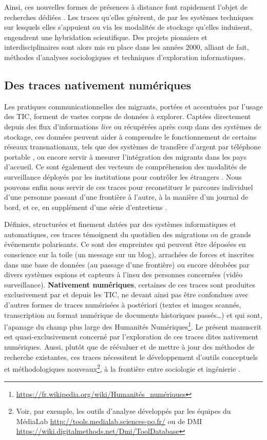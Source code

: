 \documentclass[symmetric,justified,marginals=raggedouter]{tufte-book}
\begin{document}
Ainsi, ces nouvelles formes de présences à distance font rapidement l'objet de recherches dédiées \citep{diminescu_les_2002}. Les traces qu'elles génèrent, de par les systèmes techniques sur lesquels elles s'appuient ou via les modalités de stockage qu'elles induisent, engendrent une hybridation scientifique. Des projets pionniers et interdisciplinaires sont alors mis en place dans les années 2000, alliant de fait, méthodes d'analyses sociologiques et techniques d'exploration informatiques. 

\subsection{Des traces nativement numériques}

\noindent Les pratiques communicationnelles des migrants, portées et accentuées par l'usage des TIC, forment de vastes corpus de données à explorer. Captées directement depuis des flux d'informations \textit{live} ou récupérées après coup dans des systèmes de stockage, ces données peuvent aider à comprendre le fonctionnement de certains réseaux transnationaux, tels que des systèmes de transfère d'argent par téléphone portable \citep{bounie_analyse_2010}, ou encore servir à mesurer l'inté\-gration des migrants dans les pays d'accueil. Ce sont également des vecteurs de compréhension des modalités de surveillance déployés par les institutions pour contrôler les étrangers \citep{amoore_biometric_2006}. Nous pouvons enfin nous servir de ces traces pour reconstituer le parcours individuel d'une personne passant d'une frontière à l'autre, à la manière d'un journal de bord, et ce, en supplément d'une série d'entretiens \citep{diminescu_traces_2016}.

Définies, structurées et finement datées par des systèmes informatiques et automatiques, ces traces témoignent du quotidien des migrations ou de grands événements polarisants. Ce sont des empreintes \citep{rogers_end_2009} qui peuvent être déposées en conscience sur la toile (un message sur un blog), arrachées de forces et inscrites dans une base de données (au passage d'une frontière) ou encore dérobées par divers systèmes espions et capteurs à l'insu des personnes concernées (vidéo surveillance). \textbf{Nativement numériques}, certaines de ces traces sont produites exclusivement par et depuis les TIC, ne devant ainsi pas être confondues avec d'autres formes de traces numérisées à postériori (textes et images scannés, transcription au format numérique de documents historiques passés\ldots{}) et qui sont, l'apanage du champ plus large des Humanités Numériques\footnote{\RaggedOuter \url{https://fr.wikipedia.org/wiki/Humanités_numériques}}. Le présent manuscrit est quasi-exclusivement concerné par l'exploration de ces traces dites nativement numériques. Aussi, plutôt que de réévaluer et de mettre à jour des méthodes de recherche existantes, ces traces nécessitent le développement d'outils conceptuels et méthodologiques nouveaux\footnote{\RaggedOuter Voir, par exemple, les outils d'analyse développés par les équipes du MédiaLab \url{http://tools.medialab.sciences-po.fr/} ou de DMI \url{https://wiki.digitalmethods.net/Dmi/ToolDatabase}}, à la frontière entre sociologie et ingénierie \citep{barats_manuel_2016}. 
\end{document}
